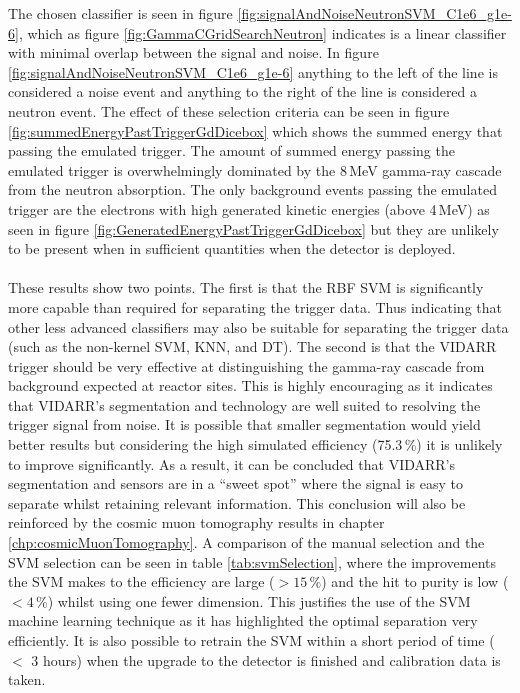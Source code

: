 The chosen classifier is seen in figure \ref{fig:signalAndNoiseNeutronSVM_C1e6_g1e-6}, which as figure \ref{fig:GammaCGridSearchNeutron} indicates is a linear classifier with minimal overlap between the signal and noise. In figure \ref{fig:signalAndNoiseNeutronSVM_C1e6_g1e-6} anything to the left of the line is considered a noise event and anything to the right of the line is considered a neutron event. The effect of these selection criteria can be seen in figure \ref{fig:summedEnergyPastTriggerGdDicebox} which shows the summed energy that passing the emulated trigger. The amount of summed energy passing the emulated trigger is overwhelmingly dominated by the 8\,MeV gamma-ray cascade from the neutron absorption. The only background events passing the emulated trigger are the electrons with high generated kinetic energies (above 4\,MeV) as seen in figure \ref{fig:GeneratedEnergyPastTriggerGdDicebox} but they are unlikely to be present when in sufficient quantities when the detector is deployed. 
\\\\These results show two points. The first is that the RBF SVM is significantly more capable than required for separating the trigger data. Thus indicating that other less advanced classifiers may also be suitable for separating the trigger data (such as the non-kernel SVM, KNN, and DT). The second is that the VIDARR trigger should be very effective at distinguishing the gamma-ray cascade from background expected at reactor sites. This is highly encouraging as it indicates that VIDARR's segmentation and technology are well suited to resolving the trigger signal from noise. It is possible that smaller segmentation would yield better results but considering the high simulated efficiency (75.3\,\%) it is unlikely to improve significantly. As a result, it can be concluded that VIDARR's segmentation and sensors are in a ``sweet spot'' where the signal is easy to separate whilst retaining relevant information. This conclusion will also be reinforced by the cosmic muon tomography results in chapter \ref{chp:cosmicMuonTomography}. A comparison of the manual selection and the SVM selection can be seen in table \ref{tab:svmSelection}, where the improvements the SVM makes to the efficiency are large ($> 15\,\%$) and the hit to purity is low ($< 4\,\%$) whilst using one fewer dimension. This justifies the use of the SVM machine learning technique as it has highlighted the optimal separation very efficiently. It is also possible to retrain the SVM within a short period of time ($<$ 3 hours) when the upgrade to the detector is finished and calibration data is taken.  

